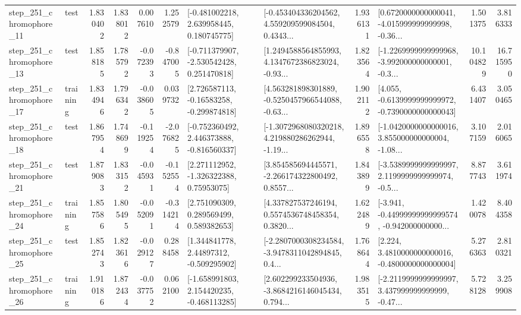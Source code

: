 \begin{tabular}{llrrrrllrlrr}
  step\_251\_chromophore\_11 &      test &      1.830402 &    1.838012 &      0.007610 &  1.252579 &    [-0.481002218, 2.639958445, 0.180745775] &  [-0.453404336204562, 4.559209599084504, 0.4343... &       1.936131 &  [0.6720000000000041, -4.015999999999998, -0.36... &            1.501375 &          3.816333 \\
  step\_251\_chromophore\_13 &      test &      1.858185 &    1.785792 &     -0.072393 & -0.847005 &   [-0.711379907, -2.530542428, 0.251470818] &  [1.2494588564855993, 4.1347672386823024, -0.93... &       1.823564 &  [-1.2269999999999968, -3.992000000000001, -0.3... &           10.104829 &         16.715950 \\
  step\_251\_chromophore\_17 &  training &      1.834946 &    1.796342 &     -0.038605 &  0.039732 &    [2.726587113, -0.16583258, -0.299874818] &  [4.563281898301889, -0.5250457966544088, -0.63... &       1.902112 &  [4.055, -0.6139999999999972, -0.7390000000000043] &            6.431407 &          3.050465 \\
  step\_251\_chromophore\_18 &      test &      1.867954 &    1.748699 &     -0.119254 & -2.076825 &   [-0.752360492, 2.446373888, -0.816560337] &  [-1.3072968080320218, 4.219880286262944, -1.19... &       1.896558 &  [-1.0420000000000016, 3.855000000000004, -1.08... &            3.107159 &          2.016065 \\
  step\_251\_chromophore\_21 &      test &      1.879083 &    1.833152 &     -0.045931 & -0.152554 &     [2.271112952, -1.326322388, 0.75953075] &  [3.854585694445571, -2.266174322800492, 0.8557... &       1.843899 &  [-3.5389999999999997, 2.1199999999999974, -0.5... &            8.877743 &          3.611974 \\
  step\_251\_chromophore\_24 &  training &      1.857586 &    1.805495 &     -0.052091 & -0.314214 &     [2.751090309, 0.289569499, 0.589382653] &  [4.337827537246194, 0.5574536748458354, 0.3820... &       1.622489 &  [-3.941, -0.44999999999999574, -0.942000000000... &            1.420078 &          8.404358 \\
  step\_251\_chromophore\_25 &      test &      1.852743 &    1.823616 &     -0.029127 &  0.288458 &     [1.344841778, 2.44897312, -0.509295902] &  [-2.2807000308234584, -3.9478311042894845, 0.4... &       1.768644 &   [2.224, 3.4810000000000016, -0.4800000000000004] &            5.276363 &          2.810321 \\
  step\_251\_chromophore\_26 &  training &      1.910186 &    1.872434 &     -0.037752 &  0.062100 &   [-1.658991803, 2.154420235, -0.468113285] &  [2.602299233504936, -3.8684216146045434, 0.794... &       1.983515 &  [-2.2119999999999997, 3.437999999999999, -0.47... &            5.728128 &          3.259908 \\

\end{tabular}
